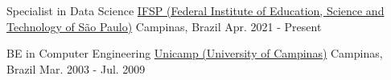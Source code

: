 

\begin{cventries}

  \cventry
    {Specialist in Data Science}
    {\href{https://ifsp.edu.br}{IFSP (Federal Institute of Education, Science and Technology of São Paulo)}}
    {Campinas, Brazil}
    {Apr. 2021 - Present}
    {}

  \cventry
    {BE in Computer Engineering} %
    {\href{https://unicamp.br}{Unicamp (University of Campinas)}} %
    {Campinas, Brazil} %
    {Mar. 2003 - Jul. 2009} %
    {}

\end{cventries}
